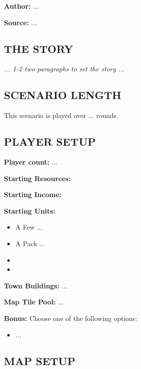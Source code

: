 
\begin{multicols*}{2}

\textbf{Author:} ...

\textbf{Source:} ...

\subsection*{\MakeUppercase{The Story}}

\textit{... 1-2 two paragraphs to set the story ...}

\subsection*{\MakeUppercase{Scenario Length}}

This scenario is played over ... rounds.

\subsection*{\MakeUppercase{Player Setup}}

\textbf{Player count:} ...

\textbf{Starting Resources:}   

\textbf{Starting Income:}   

\textbf{Starting Units:}
\begin{itemize}
  \item A Few ...
  \item A Pack ...
  \item {}
  \item {}
\end{itemize}

\textbf{Town Buildings:} ...

\textbf{Map Tile Pool:} ...

\textbf{Bonus:} Choose one of the following options: 

\begin{itemize}
    \item ...
\end{itemize}

\subsection*{\MakeUppercase{Map setup}}


\end{multicols*}
